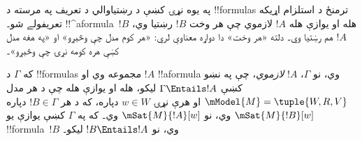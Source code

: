\documentclass[../../../include/open-logic-section]{subfiles}
\begin{document}


\begin{explain}
  په يوه نړۍ کښې د رښتياوالي د تعريف په مرسته د !!{formula}s ترمنځ
  د استلزام اړيکه تعريفولے شو۔ !!^a{formula}~$!B$ هله او يوازې هله
  $!A$ لازموي چې هر وخت $!B$ رښتيا وي، $!A$ هم رښتيا وي۔ دلته
  «هر وخت» دا دواړه معناوې لري: «هر کوم مدل چې وڅېړو» او «په هغه
  مدل کښې هره کومه نړۍ چې وڅېړو»۔
\end{explain}

\begin{defn}
  که $\Gamma$ د !!{formula}s مجموعه وي او $!A$ !!a{formula} وي، نو
  $\Gamma$، $!A$ \emph{لازموي}، چې په نښو کښې $\Gamma \Entails !A$
  ليکو، هله او يوازې هله چې د هر مدل $\mModel{M} = \tuple{W, R, V}$
  او هرې نړۍ $w \in W$ دپاره، که د هر $!B \in \Gamma$ دپاره
  $\mSat{M}{!B}[w]$ وي، نو $\mSat{M}{!A}[w]$ وي۔ که په $\Gamma$
  کښې يوازې يو !!{formula}~$!B$ وي، نو $!B \Entails !A$ ليکو۔
\end{defn}
\end{document}
